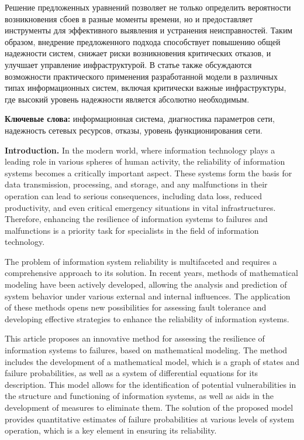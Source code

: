 Решение предложенных уравнений позволяет не только определить
вероятности возникновения сбоев в разные моменты времени, но и
предоставляет инструменты для эффективного выявления и устранения
неисправностей. Таким образом, внедрение предложенного подхода
способствует повышению общей надежности систем, снижает риски
возникновения критических отказов, и улучшает управление
инфраструктурой. В статье также обсуждаются возможности практического
применения разработанной модели в различных типах информационных систем,
включая критически важные инфраструктуры, где высокий уровень надежности
является абсолютно необходимым.

{\bfseries Ключевые слова:} информационная система, диагностика параметров
сети, надежность сетевых ресурсов, отказы, уровень функционирования
сети.

\begin{multicols}{2}
{\bfseries Introduction.} In the modern world, where information technology
plays a leading role in various spheres of human activity, the
reliability of information systems becomes a critically important
aspect. These systems form the basis for data transmission, processing,
and storage, and any malfunctions in their operation can lead to serious
consequences, including data loss, reduced productivity, and even
critical emergency situations in vital infrastructures. Therefore,
enhancing the resilience of information systems to failures and
malfunctions is a priority task for specialists in the field of
information technology.

The problem of information system reliability is multifaceted and
requires a comprehensive approach to its solution. In recent years,
methods of mathematical modeling have been actively developed, allowing
the analysis and prediction of system behavior under various external
and internal influences. The application of these methods opens new
possibilities for assessing fault tolerance and developing effective
strategies to enhance the reliability of information systems.

This article proposes an innovative method for assessing the resilience
of information systems to failures, based on mathematical modeling. The
method includes the development of a mathematical model, which is a
graph of states and failure probabilities, as well as a system of
differential equations for its description. This model allows for the
identification of potential vulnerabilities in the structure and
functioning of information systems, as well as aids in the development
of measures to eliminate them. The solution of the proposed model
provides quantitative estimates of failure probabilities at various
levels of system operation, which is a key element in ensuring its
reliability.


\end{multicols}
